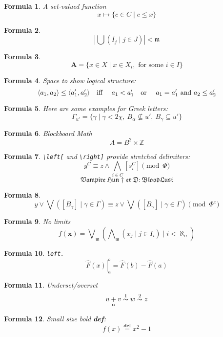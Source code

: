 \documentclass{amsart}
\newtheorem{f}{Formula}
\begin{document}
\begin{f}
    A set-valued function
\[
    x \mapsto \{ c \in C \mid c \leq x \}
\]
\end{f}
\begin{f}
    \[
        \left| \bigcup(I_j \mid j \in J)\right| < \mathfrak m
    \]
\end{f}
\begin{f}
    \[
        \mathbf A = \{ x \in X \mid x \in X_i, \text{ for some } i \in I \}
    \]
\end{f}
\begin{f}
    Space to show logical structure:
    \[
        \langle a_1,a_2\rangle \leq \langle a_1', a_2'\rangle
        \text{\quad iff \quad} a_1 < a_1' \text{\quad or \quad}
        a_1 = a_1' \text{ and } a_2 \leq a_2'
    \]
\end{f}
\begin{f}
    Here are some examples for Greek letters:
    \[
        \Gamma_{u'} = \{ \gamma \mid \gamma < 2\chi,
        \ B_\alpha \nsubseteq u',
        \ B_\gamma \subseteq u' \}
    \]
\end{f}
\begin{f}
    Blockboard Math
    \[
        A = B^2 \times \mathbb Z
    \]
\end{f}
\begin{f}
    \verb+\left[+ and \verb+\right]+ provide stretched delimiters:
    \[
        y^C \equiv z \wedge \bigwedge_{i \in C} \left[ s_i^C \right] \pmod\Phi
    \]
    \[
        \mathfrak{Vampire\ Hun\dagger er\ D: BloodLust}
    \]
\end{f}
\begin{f}
    \[
        y \vee \bigvee([B_\gamma] \mid \gamma \in \Gamma) \equiv
        z \vee \bigvee([B_\gamma] \mid \gamma \in \Gamma) \pmod{\Phi^x}
    \]
\end{f}
\begin{f}
    No limits
    \[
        f(\mathbf x) = \bigvee\nolimits_{\!\mathfrak m}
        \left(\bigwedge\nolimits_{\mathfrak m}( x_j \mid j \in I_i) \mid i < \aleph_\alpha \right)
    \]
\end{f}
\begin{f}
    \texttt{left.}
    \[
        \left. \widehat F(x)\right|_a^b = \widehat F(b) - \widehat F(a)
    \]
\end{f}
\begin{f}
    Underset/overset
    \[
        u \underset\alpha+ v \overset1\thicksim w
        \overset2\thicksim z
    \]
\end{f}
\begin{f}
    Small size bold \textbf{def}:
    \[
        f(x) \overset{\mathbf{def}}= x^2 - 1
    \]
\end{f}
\end{document}
